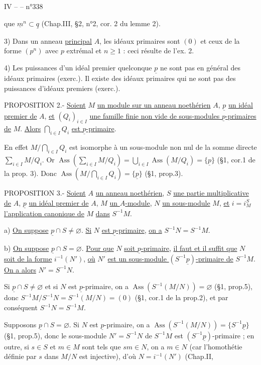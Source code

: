 
IV --  -- \hfill n°338

que $\underline m^n\subset\underline q$ (Chap.III, §2, n°2, cor. 2 du lemme 2).

3) Dans un anneau \uline{principal} $A$, les idéaux primaires sont $(0)$ et ceux de la forme $(p^n)$ avec $p$ extrémal et $n\geq1$ : ceci résulte de l'ex. 2.

4) Les puissances d'un idéal premier quelconque $\underline p$ ne sont pas en général des idéaux primaires (exerc.\quad). Il existe des idéaux primaires qui ne sont pas des puissances d'idéaux premiers (exerc.\quad).


PROPOSITION 2.- \uline{Soient} $M$ \uline{un module sur un anneau noethérien} $A$, $\underline p$ \uline{un idéal premier de} $A$, \uline{et} $(Q_i)_{i\in I}$ \uline{une famille finie non vide de sous-modules $\underline p$-primaires de} $M$. \uline{Alors} $\bigcap_{i\in I}Q_i$ \uline{est $\underline p$-primaire}.

En effet $M/\bigcap_{i\in I}Q_i$ est isomorphe à un sous-module non nul de la somme directe $\sum_{i\in I}M/Q_i$. Or $\operatorname{Ass}(\sum_{i\in I}M/Q_i)=\bigcup_{i\in I}\operatorname{Ass}(M/Q_i)=\{\underline p\}$ (§1, cor.1 de la prop. 3). Donc $\operatorname{Ass}(M/\bigcap_{i\in I}Q_i)=\{\underline p\}$ (§1, prop.3).

PROPOSITION 3.- \uline{Soient} $A$ \uline{un anneau noethérien}, $S$ \uline{une partie multiplicative de} $A$, $\underline p$ \uline{un idéal premier de} $A$, $M$ \uline{un $A$-module}, $N$ \uline{un sous-module} $M$, \uline{et} $i=i_M^S$ \uline{l'application canonique de} $M$ \uline{dans} $S^{-1}M$.

a) \uline{On suppose} $\underline p\cap S\neq\varnothing$. \uline{Si} $N$ \uline{est $\underline p$-primaire}, \uline{on a} $S^{-1}N=S^{-1}M$.

b) \uline{On suppose} $\underline p\cap S=\varnothing$. \uline{Pour que} $N$ \uline{soit $\underline p$-primaire}, \uline{il faut et il suffit que} $N$ \uline{soit de la forme} $i^{-1}(N')$, \uline{où} $N'$ \uline{est un sous-module $(S^{-1}\underline p)$-primaire de} $S^{-1}M$. \uline{On a alors} $N'=S^{-1}N$.

Si $\underline p\cap S\neq\varnothing$ et si $N$ est $\underline p$-primaire, on a $\operatorname{Ass}(S^{-1}(M/N))=\varnothing$ (§1, prop.5), donc $S^{-1}M/S^{-1}N=S^{-1}(M/N)=(0)$ (§1, cor.1 de la prop.2), et par conséquent $S^{-1}N=S^{-1}M$.

Supposons $\underline p\cap S=\varnothing$. Si $N$ est $\underline p$-primaire, on a $\operatorname{Ass}(S^{-1}(M/N))=\{S^{-1}\underline p\}$ (§1, prop.5), donc le sous-module $N'=S^{-1}N$ de $S^{-1}M$ est $(S^{-1}\underline p)$-primaire ; en outre, si $s\in S$ et $m\in M$ sont tels que $sm\in N$, on a $m\in N$ (car l'homothétie définie par $s$ dans $M/N$ est injective), d'où $N=i^{-1}(N')$ (Chap.II,


